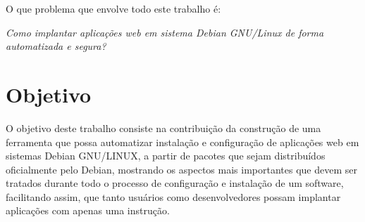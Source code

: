 O que problema que envolve todo este trabalho é:

\begin{center}
  \textit{
  Como implantar aplicações web em sistema Debian GNU/Linux de forma automatizada
  e segura?
}
\end{center}

\section{Objetivo}

O objetivo deste trabalho consiste na contribuição da construção de uma ferramenta
que possa automatizar instalação e configuração de aplicações web em sistemas
Debian GNU/LINUX, a partir de pacotes que sejam distribuídos oficialmente pelo
Debian, mostrando os aspectos mais importantes que devem ser tratados durante
todo o processo de configuração e instalação de um software, facilitando assim, que
tanto usuários como desenvolvedores possam implantar aplicações com apenas uma
instrução.

%



